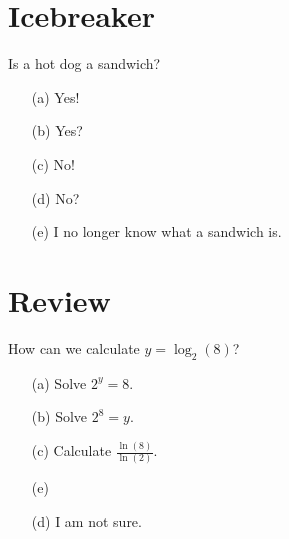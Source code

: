 \documentclass[14pt, draft]{beamer}
\begin{document}
 

%

\section{Icebreaker}

\begin{frame}
  Is a hot dog a sandwich?
  
  \medskip
  \begin{itemize} \setlength\itemsep{2ex}
    \item[(a)] Yes!
    \item[(b)] Yes?
    \item[(c)] No!
    \item[(d)] No?
    \item[(e)] I no longer know what a sandwich is.
  \end{itemize} 
\end{frame}


\section{Review}
\begin{frame}
  How can we calculate \(y = \log_{2}(8)\)?
  \medskip
  \begin{itemize} \setlength\itemsep{2ex}
    \item[(a)] Solve \(2^{y} = 8\).
    \item[(b)] Solve \(2^{8} = y\).
    \item[(c)] Calculate \(\frac{\ln(8)}{\ln(2)}\). 
    \item[(e)] 
    \item[(d)] I am not sure.
  \end{itemize} 
\end{frame} 
\end{document}
